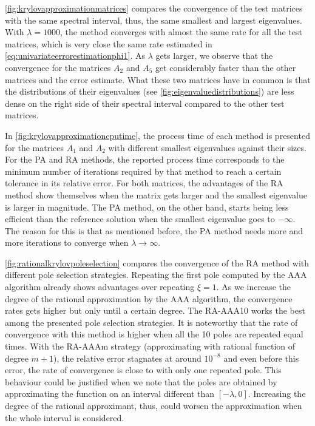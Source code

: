 \autoref{fig:krylovapproximationmatrices} compares the convergence of the
test matrices with the same spectral interval, thus, the same smallest and largest
eigenvalues.
With $\lambda = 1000$, the method converges with almost the same rate for all
the test matrices, which is very close the same rate estimated in
\eqref{eq:univariateerrorestimationphi1}.
As $\lambda$ gets larger, we observe that the convergence for the matrices
$A_2$ and $A_5$ get considerably faster than the other matrices and the error estimate.
What these two matrices have in common is that the distributions of their eigenvalues
(see \autoref{fig:eigenvaluedistributions}) are less dense on the right side of their
spectral interval compared to the other test matrices.

In \autoref{fig:krylovapproximationcputime}, the process time of each method is presented for
the matrices $A_1$ and $A_2$ with different smallest eigenvalues against their sizes. For
the PA and RA methods, the reported process time corresponds to the minimum number of
iterations required by that method to reach a certain tolerance in its relative error.
For both matrices, the advantages of the RA method show themselves when the matrix gets
larger and the smallest eigenvalue is larger in magnitude. The PA method, on the other hand,
starts being less efficient than the reference solution when the smallest eigenvalue goes
to $-\infty$. The reason for this is that as mentioned before, the PA method needs more
and more iterations to converge when $\lambda \to \infty$.

\autoref{fig:rationalkrylovpoleselection} compares the convergence of the RA method with different
pole selection strategies. Repeating the first pole computed by the AAA algorithm already shows
advantages over repeating $\xi = 1$. As we increase the degree of the rational approximation by
the AAA algorithm, the convergence rates gets higher but only until a certain degree.
The RA-AAA10 works the best among the presented pole selection strategies. It is noteworthy that
the rate of convergence with this method is higher when all the 10 poles are repeated equal times.
With the RA-AAAm strategy (approximating with rational function of degree $m+1$), the relative
error stagnates at around $10^{-8}$ and even before this error, the rate of convergence is close
to with only one repeated pole. This behaviour could be justified when we note that the poles
are obtained by approximating the function on an interval different than $[-\lambda, 0]$.
Increasing the degree of the rational approximant, thus, could worsen the approximation when the
whole interval is considered.

